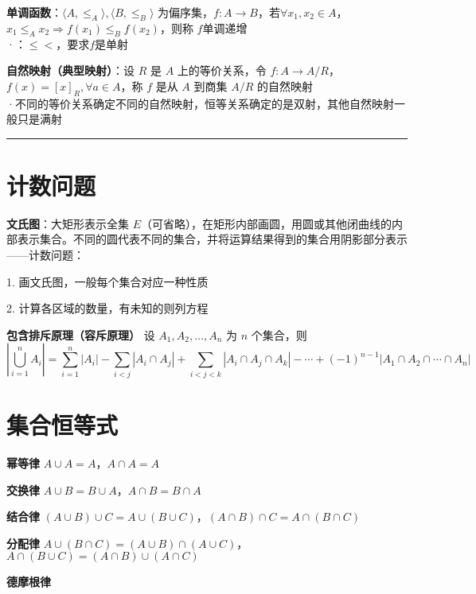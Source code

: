 	\textbf{单调函数}：$\langle A, \leqslant_A \rangle, \langle B, \leqslant_B
	 \rangle$ 为偏序集，$f: A \rightarrow B$，若$\forall x_1, x_2 \in A$，$x_1 \leqslant_A x_2 \Rightarrow f(x_1) \leqslant_B f(x_2)$，则称 $f$单调递增\\
	·：$\leqslant$$<$，要求$f$是单射
	
	
	\textbf{自然映射（典型映射）}：设 $R$ 是 $A$ 上的等价关系，令 $f: A \rightarrow A/R$，$f(x) = [x]_R, \forall a \in A$，称 $f$ 是从 $A$ 到商集 $A/R$ 的自然映射\\
	·不同的等价关系确定不同的自然映射，恒等关系确定的是双射，其他自然映射一般只是满射
	
	\hrule
	
	\section*{计数问题}	
	
	\textbf{文氏图}：大矩形表示全集 $E$（可省略），在矩形内部画圆，用圆或其他闭曲线的内部表示集合。不同的圆代表不同的集合，并将运算结果得到的集合用阴影部分表示——计数问题：
	
	1. 画文氏图，一般每个集合对应一种性质
	
	2. 计算各区域的数量，有未知的则列方程
	
	\textbf{包含排斥原理（容斥原理）} 设 $A_1, A_2, \ldots, A_n$ 为 $n$ 个集合，则
	\fontsize{4pt}{4pt}
	\begin{equation*}
		\left| \bigcup_{i=1}^{n} A_i \right| = \sum_{i=1}^{n} |A_i| - \sum_{i<j}|A_i \cap A_j| + \sum_{i<j<k}|A_i \cap A_j \cap A_k| - \cdots + (-1)^{n-1}|A_1 \cap A_2 \cap \cdots \cap A_n|
	\end{equation*}
	\fontsize{6pt}{6pt}
	
	\section*{集合恒等式}	
	
	\textbf{幂等律} $A \cup A = A$，$A \cap A = A$
	
	\textbf{交换律} $A \cup B = B \cup A$，$A \cap B = B \cap A$
	
	\textbf{结合律} $(A \cup B) \cup C = A \cup (B \cup C)$，$(A \cap B) \cap C = A \cap (B \cap C)$
	
	\textbf{分配律} $A \cup (B \cap C) = (A \cup B) \cap (A \cup C)$，$A \cap (B \cup C) = (A \cap B) \cup (A \cap C)$
	
	\textbf{德摩根律} 
	
